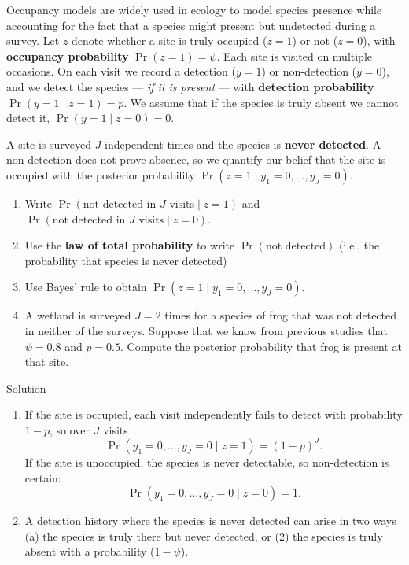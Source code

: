 \documentclass[
  letterpaper,
  DIV=11,
  numbers=noendperiod,
  oneside]{scrartcl}
\providecommand{\tightlist}{%
  \setlength{\itemsep}{0pt}\setlength{\parskip}{0pt}}\usepackage{longtable,booktabs,array}
\begin{document}
\begin{tcolorbox}[enhanced jigsaw, bottomrule=.15mm, breakable, bottomtitle=1mm, colback=white, titlerule=0mm, colbacktitle=quarto-callout-warning-color!10!white, rightrule=.15mm, toptitle=1mm, left=2mm, opacityback=0, toprule=.15mm, arc=.35mm, title={Task 3}, colframe=quarto-callout-warning-color-frame, coltitle=black, leftrule=.75mm, opacitybacktitle=0.6]

Occupancy models are widely used in ecology to model species presence
while accounting for the fact that a species might present but
undetected during a survey. Let \(z\) denote whether a site is truly
occupied (\(z = 1\)) or not (\(z = 0\)), with \textbf{occupancy
probability} \(\Pr(z = 1) = \psi\). Each site is visited on multiple
occasions. On each visit we record a detection (\(y = 1\)) or
non-detection (\(y = 0\)), and we detect the species --- \emph{if it is
present} --- with \textbf{detection probability}
\(\Pr(y = 1 \mid z = 1) = p\). We assume that if the species is truly
absent we cannot detect it, \(\Pr(y = 1 \mid z = 0) = 0\).

A site is surveyed \(J\) independent times and the species is
\textbf{never detected}. A non-detection does not prove absence, so we
quantify our belief that the site is occupied with the posterior
probability \(\Pr(z = 1 \mid y_1 = 0, \dots, y_J = 0)\).

\begin{enumerate}
\def\labelenumi{(\alph{enumi})}
\tightlist
\item
  Write \(\Pr(\text{not detected in } J \text{ visits} \mid z = 1)\) and
  \(\Pr(\text{not detected in } J \text{ visits} \mid z = 0)\).
\item
  Use the \textbf{law of total probability} to write
  \(\Pr(\text{not detected})\) (i.e., the probability that species is
  never detected)
\item
  Use Bayes' rule to obtain \(\Pr(z = 1 \mid y_1 = 0, \dots, y_J = 0)\).
\item
  A wetland is surveyed \(J = 2\) times for a species of frog that was
  not detected in neither of the surveys. Suppose that we know from
  previous studies that \(\psi = 0.8\) and \(p = 0.5\). Compute the
  posterior probability that frog is present at that site.
\end{enumerate}

Solution

\begin{enumerate}
\def\labelenumi{(\alph{enumi})}
\item
  If the site is occupied, each visit independently fails to detect with
  probability \(1 - p\), so over \(J\) visits \[
  \Pr(y_1 = 0, \dots, y_J = 0 \mid z = 1) = (1-p)^{J}.
  \] If the site is unoccupied, the species is never detectable, so
  non-detection is certain: \[
  \Pr(y_1 = 0, \dots, y_J = 0 \mid z = 0) = 1.
  \]
\item
  A detection history where the species is never detected can arise in
  two ways (a) the species is truly there but never detected, or (2) the
  species is truly absent with a probability (\(1-\psi\)).


\end{enumerate}
\end{tcolorbox}
\end{document}
